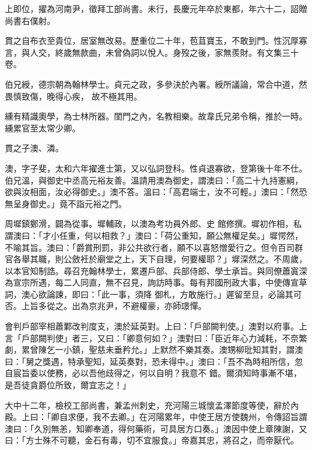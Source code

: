 \begin{pinyinscope}
 上即位，擢為河南尹，徵拜工部尚書。未行，長慶元年卒於東都，年六十二，詔贈尚書右僕射。



 貫之自布衣至貴位，居室無改易。歷重位二十年，苞苴寶玉，不敢到門。性沉厚寡言，與人交，終歲無款曲，未曾偽詞以悅人。身歿之後，家無羨財。有文集三十卷。



 伯兄綬，德宗朝為翰林學士。貞元之政，多參決於內署。綬所議論，常合中道，然畏慎致傷，晚得心疾，
 故不極其用。



 纁有精識奧學，為士林所器。閨門之內，名教相樂。故韋氏兄弟令稱，推於一時。纁累官至太常少卿。



 貫之子澳、潾。



 澳，字子斐，太和六年擢進士第，又以弘詞登科。性貞退寡欲，登第後十年不仕。伯兄溫，與御史中丞高元裕友善。溫請用澳為御史，謂澳曰：「高二十九持憲綱，欲與汝相面，汝必得御史。」澳不答。溫曰：「高君端士，汝不可輕。」澳曰：「然恐無呈身御史。」竟不詣元裕之門。



 周墀鎮鄭滑，闢為從事。墀輔政，以澳為考功員外郎、史
 館修撰。墀初作相，私謂澳曰：「才小任重，何以相救？」澳曰：「荷公重知，願公無權足矣。」墀愕然，不喻其旨。澳曰：「爵賞刑罰，非公共欲行者，願不以喜怒憎愛行之。但令百司群官各舉其職，則公斂衽於廟堂之上，天下自理，何要權耶？」墀深然之。不周歲，以本官知制誥。尋召充翰林學士，累遷戶部、兵部侍郎、學士承旨。與同僚蕭寘深為宣宗所遇，每二人同直，無不召見，詢訪時事。每有邦國刑政大事，中使傳宣草詞，澳心欲論諫，即曰：「此一事，須降
 御札，方敢施行。」遲留至旦，必論其可否。上旨多從之。出為京兆尹，不避權豪，亦師璟憚。



 會判戶部宰相蕭鄴改判度支，澳於延英對。上曰：「戶部闕判使。」澳對以府事。上言「戶部闕判使」者三，又曰：「卿意何如？」澳對曰：「臣近年心力減耗，不奈繁劇，累曾陳乞一小鎮，聖慈未垂矜允。」上默然不樂其奏。澳甥柳玭知其對，謂澳曰：「舅之獎遇，特承聖知，延英奏對，恐未得中。」澳曰：「吾不為時相所信，忽自宸旨委以使務，必以吾他歧得之，何以自明？我意不
 錯。爾須知時事漸不堪，是吾徒貪爵位所致，爾宜志之！」



 大中十二年，檢校工部尚書，兼孟州刺史，充河陽三城懷孟澤節度等使，辭於內殿。上曰：「卿自求便，我不去卿。」在河陽累年，中使王居方使魏州，令傳詔旨謂澳曰：「久別無恙，知卿奉道，得何藥術，可具居方口奏。」澳因中使上章陳謝，又曰：「方士殊不可聽，金石有毒，切不宜服食。」帝嘉其忠，將召之，而帝厭代。




\end{pinyinscope}
